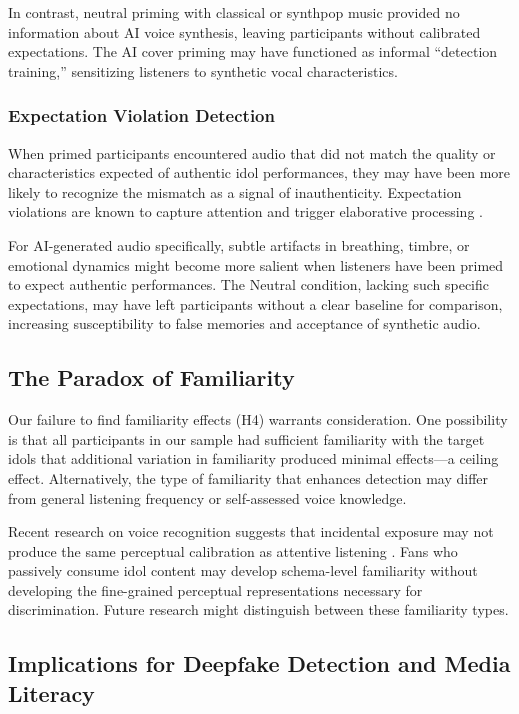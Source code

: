 \documentclass[12pt, a4paper]{article}
\begin{document}
In contrast, neutral priming with classical or synthpop music provided no information about AI voice synthesis, leaving participants without calibrated expectations. The AI cover priming may have functioned as informal ``detection training,'' sensitizing listeners to synthetic vocal characteristics.

\subsubsection{Expectation Violation Detection}

When primed participants encountered audio that did not match the quality or characteristics expected of authentic idol performances, they may have been more likely to recognize the mismatch as a signal of inauthenticity. Expectation violations are known to capture attention and trigger elaborative processing \citep{meyer1997surprise, scherer2001appraisal}.

For AI-generated audio specifically, subtle artifacts in breathing, timbre, or emotional dynamics might become more salient when listeners have been primed to expect authentic performances. The Neutral condition, lacking such specific expectations, may have left participants without a clear baseline for comparison, increasing susceptibility to false memories and acceptance of synthetic audio.

\subsection{The Paradox of Familiarity}

Our failure to find familiarity effects (H4) warrants consideration. One possibility is that all participants in our sample had sufficient familiarity with the target idols that additional variation in familiarity produced minimal effects---a ceiling effect. Alternatively, the type of familiarity that enhances detection may differ from general listening frequency or self-assessed voice knowledge.

Recent research on voice recognition suggests that incidental exposure may not produce the same perceptual calibration as attentive listening \citep{lavan2019flexible}. Fans who passively consume idol content may develop schema-level familiarity without developing the fine-grained perceptual representations necessary for discrimination. Future research might distinguish between these familiarity types.

\subsection{Implications for Deepfake Detection and Media Literacy}
\end{document}
